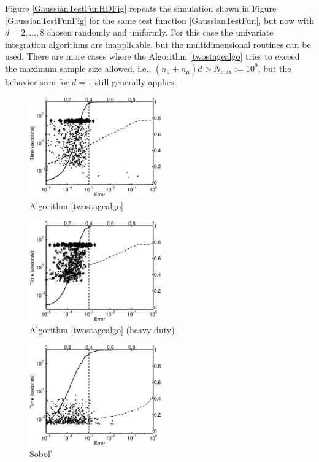 \documentclass[graybox]{svmult}
\begin{document}
Figure \ref{GaussianTestFunHDFig} repeats the simulation shown in Figure \ref{GaussianTestFunFig} for the same test function \eqref{GaussianTestFun}, but now with $d=2, \ldots, 8$ chosen randomly and uniformly.  For this case the univariate integration algorithms are inapplicable, but the multidimensional routines can be used.  There are more cases where the Algorithm \ref{twostagealgo} tries to exceed the maximum sample size allowed, i.e., $(n_{\sigma}+n_\mu)d > N_{\max}:=10^9$, but the behavior seen for $d=1$ still generally applies.  

\begin{figure}
\centering
\begin{minipage}{5.7cm} \centering \includegraphics[width=5.7cm]{gaussiand=6iidErrTime.eps} \\ Algorithm \ref{twostagealgo} \end{minipage}
\begin{minipage}{5.7cm} \centering \includegraphics[width=5.7cm]{gaussiand=6iidheavyErrTime.eps} \\ Algorithm \ref{twostagealgo} (heavy duty) \end{minipage}
\begin{minipage}{5.7cm} \centering \includegraphics[width=5.7cm]{gaussiand=6SobolErrTime.eps} \\ Sobol' \end{minipage}

\end{figure}
\end{document}
